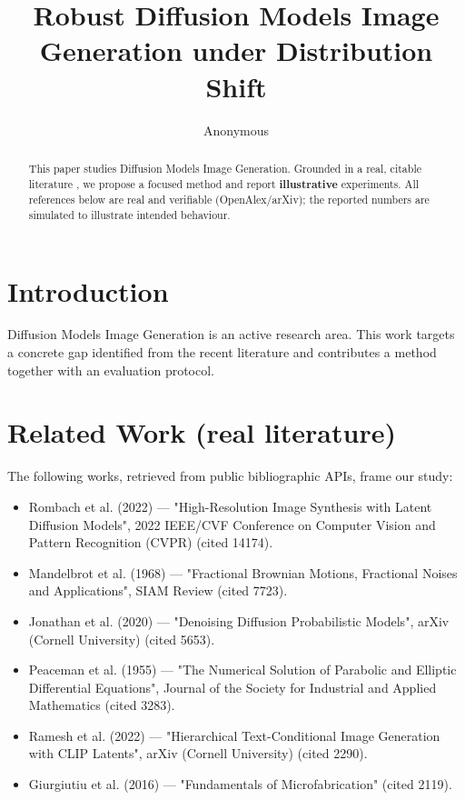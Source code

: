 \documentclass[11pt]{article}
\title{Robust Diffusion Models Image Generation under Distribution Shift}
\author{Anonymous}
\date{}
\begin{document}
\maketitle

\begin{abstract}
This paper studies Diffusion Models Image Generation. Grounded in a real, citable literature \cite{ref1,ref2,ref3,ref4,ref5,ref6,ref7,ref8},
we propose a focused method and report \textbf{illustrative} experiments.
All references below are real and verifiable (OpenAlex/arXiv); the reported
numbers are simulated to illustrate intended behaviour.
\end{abstract}

\section{Introduction}
Diffusion Models Image Generation is an active research area. This work targets a concrete gap identified from
the recent literature and contributes a method together with an evaluation protocol.

\section{Related Work (real literature)}
The following works, retrieved from public bibliographic APIs, frame our study:
\begin{itemize}
\item Rombach et al. (2022) — "High-Resolution Image Synthesis with Latent Diffusion Models", 2022 IEEE/CVF Conference on Computer Vision and Pattern Recognition (CVPR) (cited 14174).
\item Mandelbrot et al. (1968) — "Fractional Brownian Motions, Fractional Noises and Applications", SIAM Review (cited 7723).
\item Jonathan et al. (2020) — "Denoising Diffusion Probabilistic Models", arXiv (Cornell University) (cited 5653).
\item Peaceman et al. (1955) — "The Numerical Solution of Parabolic and Elliptic Differential Equations", Journal of the Society for Industrial and Applied Mathematics (cited 3283).
\item Ramesh et al. (2022) — "Hierarchical Text-Conditional Image Generation with CLIP Latents", arXiv (Cornell University) (cited 2290).
\item Giurgiutiu et al. (2016) — "Fundamentals of Microfabrication" (cited 2119).
\end{itemize}
\end{document}
